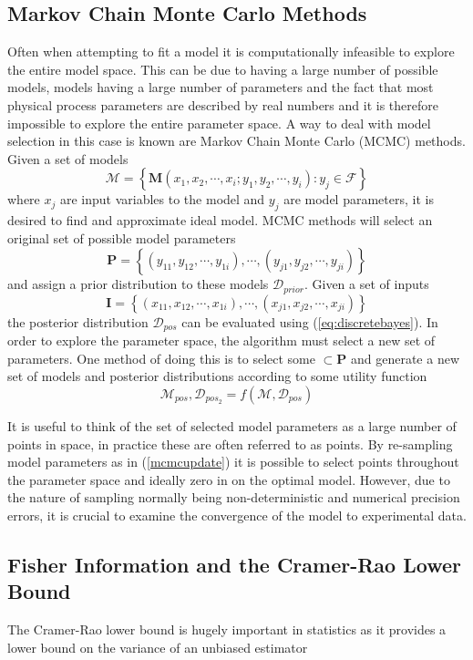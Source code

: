 \subsection{Markov Chain Monte Carlo Methods}
\label{sec:mcmcupdate}
Often when attempting to fit a model it is computationally infeasible to explore the entire model space. This can be due to having a large number of possible models, models having a large number of parameters and the fact that most physical process parameters are described by real numbers and it is therefore impossible to explore the entire parameter space. A way to deal with model selection in this case is known are Markov Chain Monte Carlo (MCMC) methods. Given a set of models 
\begin{equation}
\mathcal{M} = \left\{\mathbf{M}(x_1,x_2,\cdots,x_i;y_1,y_2,\cdots,y_i) : y_j \in \mathcal{F}\right\}
\label{eq:models}
\end{equation}
where $x_j$ are input variables to the model and $y_j$ are model parameters, it is desired to find and approximate ideal model. MCMC methods will select an original set of possible model parameters $$\mathbf{P} = \left\{(y_{11},y_{12},\cdots,y_{1i}),\cdots,(y_{j1},y_{j2},\cdots,y_{ji})\right\}$$ and assign a prior distribution to these models $\mathcal{D}_{prior}$. Given a set of inputs $$\mathbf{I} = \left\{(x_{11},x_{12},\cdots,x_{1i}),\cdots,(x_{j1},x_{j2},\cdots,x_{ji})\right\}$$ the posterior distribution $\mathcal{D}_{pos}$ can be evaluated using (\ref{eq:discretebayes}). In order to explore the parameter space, the algorithm must select a new set of parameters. One method of doing this is to select some $\subset \mathbf{P}$ and generate a new set of models and posterior distributions according to some utility function\cite{bayes}
\begin{equation}
\mathcal{M}_{pos},\mathcal{D}_{pos_2} = f(\mathcal{M},\mathcal{D}_{pos})
\label{mcmcupdate} 
\end{equation}

It is useful to think of the set of selected model parameters as a large number of points in space, in practice these are often referred to as points. By re-sampling model parameters as in (\ref{mcmcupdate}) it is possible to select points throughout the parameter space and ideally zero in on the optimal model. However, due to the nature of sampling normally being non-deterministic and numerical precision errors, it is crucial to examine the convergence of the model to experimental data. 

\subsection{Fisher Information and the Cramer-Rao Lower Bound}
The Cramer-Rao lower bound is hugely important in statistics as it provides a lower bound on the variance of an unbiased estimator 
